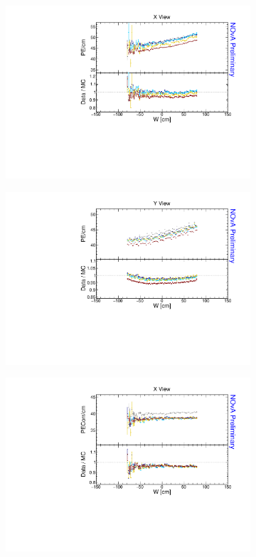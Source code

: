 \begin{figure}[!ht]
  \begin{subfigure}{0.5\textwidth}
    \includegraphics[width=\linewidth]{essentialsec_tb/pecm_w_x.pdf}
  \end{subfigure}
  \begin{subfigure}{0.5\textwidth}
    \includegraphics[width=\linewidth]{essentialsec_tb/pecm_w_y.pdf}
  \end{subfigure}
  \begin{subfigure}{0.5\textwidth}
    \includegraphics[width=\linewidth]{essentialsec_tb/pecorrcm_w_x.pdf}

\end{subfigure}
\end{figure}
